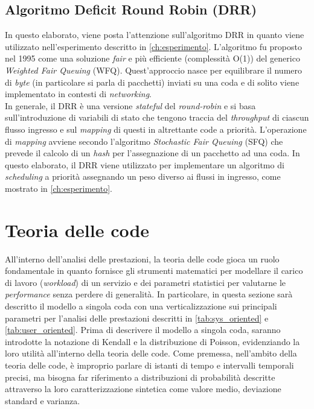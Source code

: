\subsection{Algoritmo Deficit Round Robin (DRR)}\label{s:drr}
In questo elaborato, viene posta l'attenzione sull'algoritmo DRR in quanto viene utilizzato nell'esperimento descritto in \cref{ch:esperimento}. L'algoritmo fu proposto nel 1995 come una soluzione \textit{fair} e più efficiente (complessità O(1)) del generico \textit{Weighted Fair Queuing} (WFQ)\cite{wiki:drr}. Quest'approccio nasce per equilibrare il numero di \textit{byte} (in particolare si parla di pacchetti) inviati su una coda e di solito viene implementato in contesti di \textit{networking}.\\
In generale, il DRR è una versione \textit{stateful} del \textit{round-robin} e si basa sull'introduzione di variabili di stato\cite{shreedhar1996efficient} che tengono traccia del \textit{throughput} di ciascun flusso ingresso e sul \textit{mapping} di questi in altrettante code a priorità. L'operazione di \textit{mapping} avviene secondo l'algoritmo \textit{Stochastic Fair Queuing} (SFQ) \cite{shreedhar1996efficient} che prevede il calcolo di un \textit{hash} per l'assegnazione di un pacchetto ad una coda. In questo elaborato, il DRR viene utilizzato per implementare un algoritmo di \textit{scheduling} a priorità assegnando un peso diverso ai flussi in ingresso, come mostrato in \cref{ch:esperimento}.

\section{Teoria delle code}
All'interno dell'analisi delle prestazioni, la teoria delle code gioca un ruolo fondamentale in quanto fornisce gli strumenti matematici per modellare il carico di lavoro (\textit{workload}) di un servizio e dei parametri statistici per valutarne le \textit{performance} senza perdere di generalità. In particolare, in questa sezione sarà descritto il modello a singola coda con una verticalizzazione sui principali parametri per l'analisi delle prestazioni descritti in \cref{tab:sys_oriented} e \cref{tab:user_oriented}. Prima di descrivere il modello a singola coda, saranno introdotte la notazione di Kendall e la distribuzione di Poisson, evidenziando la loro utilità all'interno della teoria delle code.\newline
Come premessa, nell'ambito della teoria delle code, è improprio parlare di istanti di tempo e intervalli temporali precisi, ma bisogna far riferimento a distribuzioni di probabilità descritte attraverso la loro caratterizzazione sintetica come valore medio, deviazione standard e varianza.

